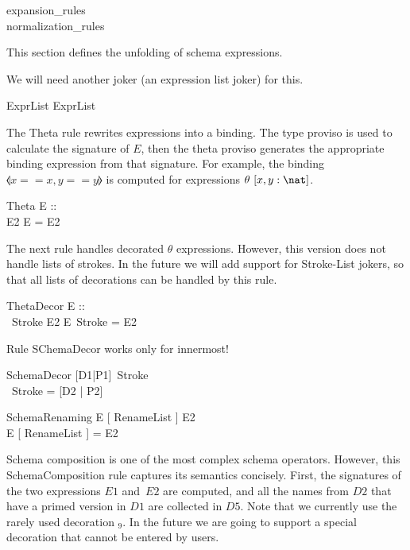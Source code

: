 \begin{zsection}
  \SECTION expansion\_rules \\ \parents normalization\_rules
\end{zsection}

This section defines the unfolding of schema expressions.

We will need another joker (an expression list joker) for this.
\begin{zedjoker}{ExprList} ExprList \end{zedjoker}


The Theta rule rewrites expressions into a binding.  The type proviso
is used to calculate the signature of $E$, then the theta proviso
generates the appropriate binding expression from that signature.  For
example, the binding $\lblot x==x,y==y \rblot$ is computed for
expressions $\theta~[x,y:\nat]$.

\begin{zedrule}{Theta}
  E :: \power [D | true] \\
  \theta [D | true] \is E2
\derives
  \theta E = E2
\end{zedrule}

The next rule handles decorated $\theta$ expressions.  However, this
version does not handle lists of strokes.  In the future we will add
support for Stroke-List jokers, so that all lists of decorations can
be handled by this rule.

\begin{zedrule}{ThetaDecor}
  E :: \power [D | true] \\
  \theta [D | true]~Stroke \is E2
\derives
  \theta E~Stroke = E2
\end{zedrule}


Rule SChemaDecor works only for innermost!

\begin{zedrule}{SchemaDecor}
  [D1|P1]~Stroke \is [D2|P2] \\
\derives
  [D1|P1]~Stroke = [D2 | P2]
\end{zedrule}




\begin{zedrule}{SchemaRenaming}
   E [ RenameList ] \is E2 \\
\derives
   E [ RenameList ] = E2
\end{zedrule}

Schema composition is one of the most complex schema operators.
However, this SchemaComposition rule captures its semantics concisely.
First, the signatures of the two expressions $E1$ and~$E2$ are
computed, and all the names from $D2$ that have a primed version in
$D1$ are collected in $D5$.  Note that we currently use the rarely
used decoration $_9$.  In the future we are going to support a special
decoration that cannot be entered by users.

